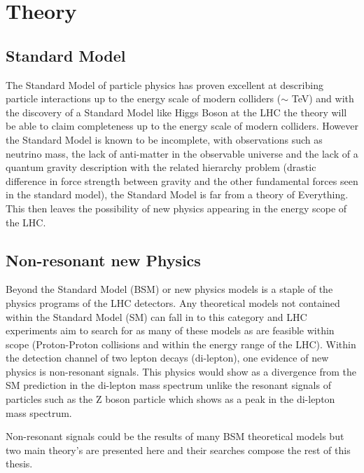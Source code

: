 \chapter{Theory}


\section{Standard Model}
    
    The Standard Model of particle physics has proven excellent at describing particle interactions up to the energy scale of modern colliders ($\sim$ TeV) and with the discovery of a Standard Model like Higgs Boson at the LHC the theory will be able to claim completeness up to the energy scale of modern colliders. However the Standard Model is known to be incomplete, with observations such as neutrino mass, the lack of anti-matter in the observable universe and the lack of a quantum gravity description with the related hierarchy problem (drastic difference in force strength between gravity and the other fundamental forces seen in the standard model),  the Standard Model is far from a theory of Everything. This then leaves the possibility of new physics appearing in the energy scope of the LHC.










\section{Non-resonant new Physics}

    Beyond the Standard Model (BSM) or new physics models is a staple of the physics programs of the LHC detectors. Any theoretical models not contained within the Standard Model (SM) can fall in to this category and LHC experiments aim to search for as many of these models as are feasible within scope (Proton-Proton collisions and within the energy range of the LHC). Within the detection channel of two lepton decays (di-lepton), one evidence of new physics is non-resonant signals. This physics would show as a divergence from the SM prediction in the di-lepton mass spectrum unlike the resonant signals of particles such as the Z boson particle which shows as a peak in the di-lepton mass spectrum.

    Non-resonant signals could be the results of many BSM theoretical models but two main theory’s are presented here and their searches compose the rest of this thesis.


